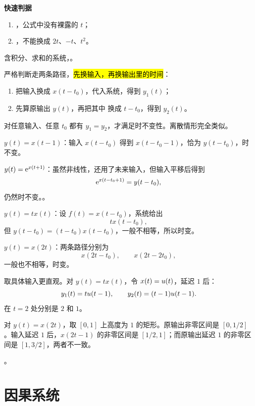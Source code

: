 \noindent\textbf{快速判据}
\begin{enumerate}
  \item {}，公式中没有裸露的 $t$；
  \item {}，不能换成 $2t$、$-t$、$t^2$。
\end{enumerate}
含积分、求和的系统，。

严格判断走两条路径，\hl{先换输入，再换输出里的时间}：
\begin{enumerate}
  \item 把输入换成 $x(t-t_0)$，代入系统，得到 $y_1(t)$；
  \item 先算原输出 $y(t)$，再把其中 换成 $t-t_0$，得到 $y_2(t)$。
\end{enumerate}
对任意输入、任意 $t_0$ 都有 $y_1=y_2$，才满足时不变性。离散情形完全类似。

\begin{example}[延迟与非线性的组合]
  $y(t)=x(t-1)$：输入 $x(t-t_0)$ 得到 $x(t-t_0-1)$，恰为 $y(t-t_0)$，时不变。

  $y(t)=\mathrm{e}^{x(t+1)}$：虽然非线性，还用了未来输入，但输入平移后得到
  \[
    \mathrm{e}^{x(t-t_0+1)}=y(t-t_0),
  \]
  仍然时不变。。
\end{example}

\begin{example}[显含时间与时间缩放]
  $y(t)=t x(t)$：设 $f(t)=x(t-t_0)$，系统给出
  \[
    t x(t-t_0),
  \]
  但 $y(t-t_0)=(t-t_0)x(t-t_0)$，一般不相等，所以时变。

  $y(t)=x(2t)$：两条路径分别为
  \[
    x(2t-t_0),
    \qquad
    x(2t-2t_0),
  \]
  一般也不相等，时变。
\end{example}

取具体输入更直观。对 $y(t)=t x(t)$，令 $x(t)=u(t)$，延迟 $1$ 后：
\[
  y_1(t)=tu(t-1),\qquad
  y_2(t)=(t-1)u(t-1).
\]
在 $t=2$ 处分别是 $2$ 和 $1$。

对 $y(t)=x(2t)$，取 $[0,1]$ 上高度为 $1$ 的矩形。原输出非零区间是 $[0,1/2]$。输入延迟 $1$ 后，$x(2t-1)$ 的非零区间是 $[1/2,1]$；而原输出延迟 $1$ 的非零区间是 $[1,3/2]$，两者不一致。

。

\section{因果系统}
\label{sec:causal-systems}

